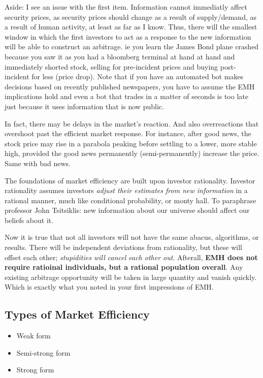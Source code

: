 \documentclass{article}
\begin{document}
Aside: I see an issue with the first item. Information cannot immediatly affect security prices, as security prices should change as a result of supply/demand, as a result of human activity, at least as far as I know. Thus, there will the smallest window in which the first investors to act as a response to the new information will be able to construct an arbitrage. ie you learn the James Bond plane crashed because you saw it as you had a bloomberg terminal at hand at hand and immediately shorted stock, selling for pre-incident prices and buying post-incident for less (price drop). Note that if you have an automated bot makes decisions based on recently published newspapers, you have to assume the EMH implications hold and even a bot that trades in a matter of seconds is too late just because it uses information that is now public. 

In fact, there may be delays in the market's reaction. And also overreactions that overshoot past the efficient market response. For instance, after good news, the stock price may rise in a parabola peaking before settling to a lower, more stable high, provided the good news permanently (semi-permanently) increase the price. Same with bad news.

The foundations of market efficiency are built upon investor rationality. Investor rationality assumes investors \textit{adjust their estimates from new information} in a rational manner, much like conditional probability, or monty hall. To paraphrase professor John Tsitsiklis: new information about our universe should affect our beliefs about it.

Now it is true that not all investors will not have the same abacus, algorithms, or results. There will be independent deviations from rationality, but these will offset each other; \textit{stupidities will cancel each other out}. Afterall, \textbf{EMH does not require ratioinal individuals, but a rational population overall}. Any existing arbitrage opportunity will be taken in large quantity and vanish quickly. Which is exactly what you noted in your first impressions of EMH. 

\subsection{Types of Market Efficiency}
\begin{itemize}
\item Weak form
\item Semi-strong form
\item Strong form
\end{itemize}
\end{document}
